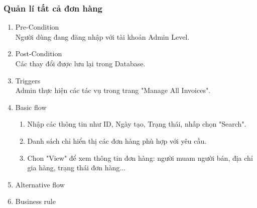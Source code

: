 \subsubsection{Quản lí tất cả đơn hàng}
\begin{enumerate}
	\item Pre-Condition\\
	Người dùng đang đăng nhập với tài khoản Admin Level.
	\item Post-Condition\\
	Các thay đổi được lưu lại trong Database.
	\item Triggers\\
	Admin thực hiện các tác vụ trong trang "Manage All Invoices".
	\item Basic flow
	\begin{enumerate}
		\item Nhập các thông tin như ID, Ngày tạo, Trạng thái, nhấp chọn "Search". 
		\item Danh sách chỉ hiển thị các đơn hàng phù hợp với yêu cầu.
		\item Chon "View" để xem thông tin đơn hàng: người muam người bán, địa chỉ gia hàng, trạng thái đơn hàng...
	\end{enumerate}
	\item Alternative flow
	\item Business rule
\end{enumerate}